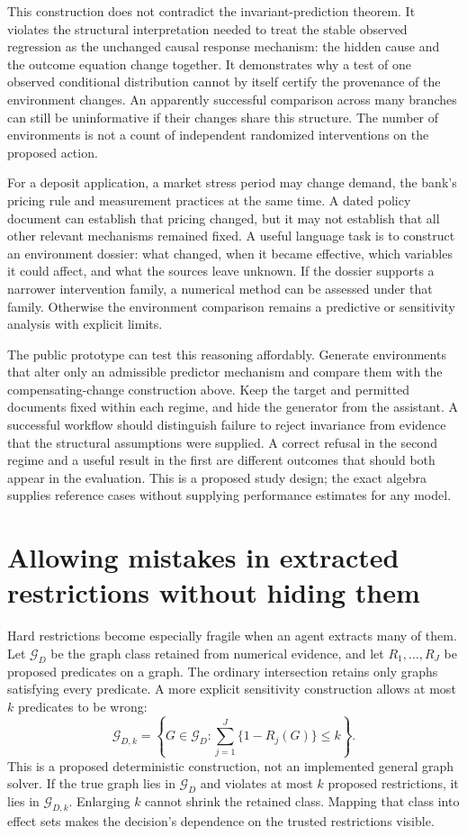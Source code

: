 This construction does not contradict the invariant-prediction theorem. It
violates the structural interpretation needed to treat the stable observed
regression as the unchanged causal response mechanism: the hidden cause and
the outcome equation change together. It demonstrates why a test of one
observed conditional distribution cannot by itself certify the provenance of
the environment changes. An apparently successful comparison across many
branches can still be uninformative if their changes share this structure.
The number of environments is not a count of independent randomized
interventions on the proposed action.

For a deposit application, a market stress period may change demand, the
bank's pricing rule and measurement practices at the same time. A dated
policy document can establish that pricing changed, but it may not establish
that all other relevant mechanisms remained fixed. A useful language task is
to construct an environment dossier: what changed, when it became effective,
which variables it could affect, and what the sources leave unknown. If the
dossier supports a narrower intervention family, a numerical method can be
assessed under that family. Otherwise the environment comparison remains a
predictive or sensitivity analysis with explicit limits.

The public prototype can test this reasoning affordably. Generate environments
that alter only an admissible predictor mechanism and compare them with the
compensating-change construction above. Keep the target and permitted
documents fixed within each regime, and hide the generator from the assistant.
A successful workflow should distinguish failure to reject invariance from
evidence that the structural assumptions were supplied. A correct refusal in
the second regime and a useful result in the first are different outcomes
that should both appear in the evaluation. This is a proposed study design;
the exact algebra supplies reference cases without supplying performance
estimates for any model.

\section{Allowing mistakes in extracted restrictions without hiding them}
\label{exec14:l4-restriction-errors}

Hard restrictions become especially fragile when an agent extracts many of
them. Let $\mathcal G_D$ be the graph class retained from numerical evidence,
and let $R_1,\ldots,R_J$ be proposed predicates on a graph. The ordinary
intersection retains only graphs satisfying every predicate. A more explicit
sensitivity construction allows at most $k$ predicates to be wrong:
\[
 \mathcal G_{D,k}=\left\{G\in\mathcal G_D:
       \sum_{j=1}^J\{1-R_j(G)\}\leq k\right\}.
\]
This is a proposed deterministic construction, not an implemented general
graph solver. If the true graph lies in $\mathcal G_D$ and violates at most
$k$ proposed restrictions, it lies in $\mathcal G_{D,k}$. Enlarging $k$ cannot
shrink the retained class. Mapping that class into effect sets makes the
decision's dependence on the trusted restrictions visible.

